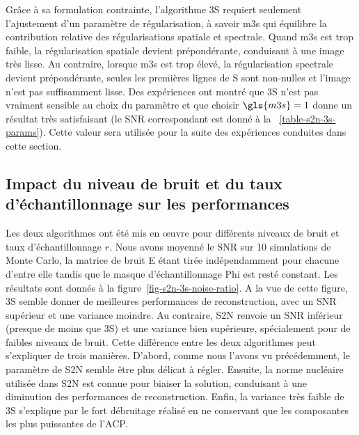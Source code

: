 Grâce à sa formulation contrainte, l'algorithme 3S requiert seulement l'ajustement d'un paramètre de régularisation, à savoir \gls{m3s} qui équilibre la contribution relative des régularisations spatiale et spectrale. Quand \gls{m3s} est trop faible, la régularisation spatiale devient prépondérante, conduisant à une image très lisse. Au contraire, lorsque \gls{m3s} est trop élevé, la régularisation spectrale devient prépondérante, seules les premières lignes de \gls{S} sont non-nulles et l'image n'est pas suffisamment lisse. Des expériences ont montré que 3S n'est pas vraiment sensible au choix du paramètre et que choisir $\gls{m3s}=1$ donne un résultat très satisfaisant (le SNR correspondant est donné à la \tabname~\ref{table-s2n-3s-params}). Cette valeur sera utilisée pour la suite des expériences conduites dans cette section.


\subsection{Impact du niveau de bruit et du taux d'échantillonnage sur les performances}

Les deux algorithmes ont été mis en \oe{}uvre pour différents niveaux de bruit et taux d'échantillonnage $r$. Nous avons moyenné le SNR sur 10 simulations de Monte Carlo, la matrice de bruit \gls{E} étant tirée indépendamment pour chacune d'entre elle tandis que le masque d'échantillonnage \gls{Phi} est resté constant. 
%
Les résultats sont donnés à la figure~\ref{fig-s2n-3s-noise-ratio}.
%
A la vue de cette figure, 3S semble donner de meilleures performances de reconstruction, avec un SNR supérieur et une variance moindre. Au contraire, S2N renvoie un SNR inférieur (presque  de moins que 3S) et une variance bien supérieure, spécialement pour de faibles niveaux de bruit.
%
Cette différence entre les deux algorithmes peut s'expliquer de trois manières. D'abord, comme nous l'avons vu précédemment, le paramètre de S2N semble être plus délicat à régler. Ensuite, la norme nucléaire utilisée dans S2N  est connue pour biaiser la solution, conduisant à une diminution des performances de reconstruction. Enfin, la variance très faible de 3S s'explique par le fort débruitage réalisé en ne conservant que les composantes les plus puissantes de l'ACP.

